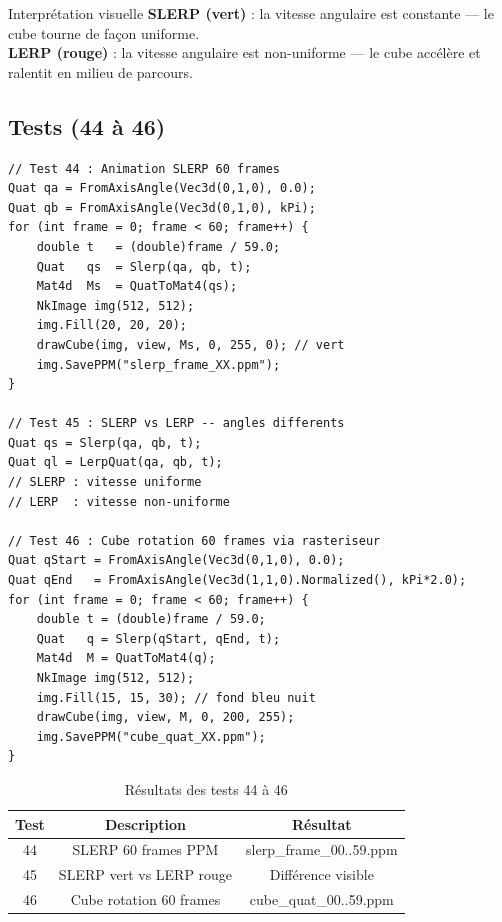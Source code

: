 \documentclass[12pt,a4paper]{report}
\begin{document}
\begin{infobox}{Interprétation visuelle}
\textbf{SLERP (vert)} : la vitesse angulaire est constante ---
le cube tourne de façon uniforme.\\
\textbf{LERP (rouge)} : la vitesse angulaire est non-uniforme ---
le cube accélère et ralentit en milieu de parcours.
\end{infobox}

\subsection{Tests (44 à 46)}

\begin{lstlisting}[caption={Tests SLERP et animation}]
// Test 44 : Animation SLERP 60 frames
Quat qa = FromAxisAngle(Vec3d(0,1,0), 0.0);
Quat qb = FromAxisAngle(Vec3d(0,1,0), kPi);
for (int frame = 0; frame < 60; frame++) {
    double t   = (double)frame / 59.0;
    Quat   qs  = Slerp(qa, qb, t);
    Mat4d  Ms  = QuatToMat4(qs);
    NkImage img(512, 512);
    img.Fill(20, 20, 20);
    drawCube(img, view, Ms, 0, 255, 0); // vert
    img.SavePPM("slerp_frame_XX.ppm");
}

// Test 45 : SLERP vs LERP -- angles differents
Quat qs = Slerp(qa, qb, t);
Quat ql = LerpQuat(qa, qb, t);
// SLERP : vitesse uniforme
// LERP  : vitesse non-uniforme

// Test 46 : Cube rotation 60 frames via rasteriseur
Quat qStart = FromAxisAngle(Vec3d(0,1,0), 0.0);
Quat qEnd   = FromAxisAngle(Vec3d(1,1,0).Normalized(), kPi*2.0);
for (int frame = 0; frame < 60; frame++) {
    double t = (double)frame / 59.0;
    Quat   q = Slerp(qStart, qEnd, t);
    Mat4d  M = QuatToMat4(q);
    NkImage img(512, 512);
    img.Fill(15, 15, 30); // fond bleu nuit
    drawCube(img, view, M, 0, 200, 255);
    img.SavePPM("cube_quat_XX.ppm");
}
\end{lstlisting}

\begin{table}[H]
    \centering
    \begin{tabular}{|c|c|c|}
        \hline
        \textbf{Test} & \textbf{Description} & \textbf{Résultat} \\
        \hline
        44 & SLERP 60 frames PPM & slerp\_frame\_00..59.ppm \\
        45 & SLERP vert vs LERP rouge & Différence visible \\
        46 & Cube rotation 60 frames & cube\_quat\_00..59.ppm \\
        \hline
    \end{tabular}
    \caption{Résultats des tests 44 à 46}
\end{table}
\end{document}
